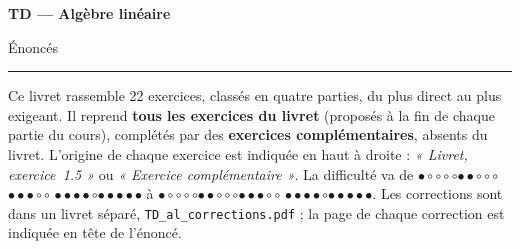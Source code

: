 \documentclass[a4paper,11pt]{article}
\numberwithin{equation}{section}
\numberwithin{figure}{section}
\numberwithin{table}{section}
\theoremstyle{enonce}
\theoremstyle{exemple}
\theoremstyle{remarque}
\newcommand{\niveau}[1]{{\color{Ocre}\footnotesize
  \ifcase#1\or$\bullet\circ\circ\circ\circ$\or$\bullet\bullet\circ\circ\circ$\or$\bullet\bullet\bullet\circ\circ$%
  \or$\bullet\bullet\bullet\bullet\circ$\or$\bullet\bullet\bullet\bullet\bullet$\fi}}
\begin{document}
\thispagestyle{plain}
{\sffamily\small\color{Gris}}\par\vspace{0.2em}
{\sffamily\bfseries\fontsize{26}{30}\selectfont\color{Ink}TD --- Algèbre linéaire}\par\vspace{0.3em}
{\sffamily\Large\color{BleuMoyen}Énoncés}\par\vspace{0.4em}
{\color{Ocre}\rule{3.2cm}{1.4pt}}\par\vspace{0.8em}
{\small Ce livret rassemble 22 exercices, classés en quatre parties, du plus direct au plus exigeant.
Il reprend \textbf{tous les exercices du livret} (proposés à la fin de chaque partie du cours), complétés par des
\textbf{exercices complémentaires}, absents du livret. L'origine de chaque exercice est indiquée en haut à droite :
\emph{« Livret, exercice~1.5 »} ou \emph{« Exercice complémentaire »}. La difficulté va de \niveau{1} à \niveau{5}.
Les corrections sont dans un livret séparé, \texttt{TD\_al\_corrections.pdf} ; la page de chaque correction est indiquée en tête de l'énoncé.}
\end{document}
